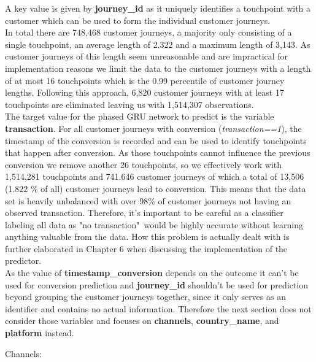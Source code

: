 A key value is given by \textbf{journey\_id} as it uniquely identifies a touchpoint with a customer which can be used to form the individual customer journeys.\\
In total there are 748,468 customer journeys, a majority only consisting of a single touchpoint, an average length of 2.322 and a maximum length of 3,143. As customer journeys of this length seem unreasonable and are impractical for implementation reasons we limit the data to the customer journeys with a length of at most 16 touchpoints which is the 0.99 percentile of customer journey lengths. Following this approach, 6,820 customer journeys with at least 17 touchpoints are eliminated leaving us with 1,514,307 observations.\\
The target value for the phased GRU network to predict is the variable \textbf{transaction}. For all customer journeys with conversion (\textit{transaction==1}), the timestamp of the conversion is recorded and can be used to identify touchpoints that happen after conversion. As those touchpoints cannot influence the previous conversion we remove another 26 touchpoints, so we effectively work with 1,514,281 touchpoints and 741.646 customer journeys of which a total of 13,506 (1.822 \% of all) customer journeys lead to conversion. 
This means that the data set is heavily unbalanced with over 98\% of customer journeys not having an observed transaction. Therefore, it's important to be careful as a classifier labeling all data as "no transaction"\ would be highly accurate without learning anything valuable from the data. How this problem is actually dealt with is further elaborated in Chapter 6 when discussing the implementation of the predictor. \\
As the value of \textbf{timestamp\_conversion} depends on the outcome it can't be used for conversion prediction and \textbf{journey\_id} shouldn't be used for prediction beyond grouping the customer journeys together, since it only serves as an identifier and contains no actual information. Therefore the next section does not consider those variables and focuses on \textbf{channels}, \textbf{country\_name}, and \textbf{platform} instead.

\begin{description}
    \item[Channels:]
\end{description}

